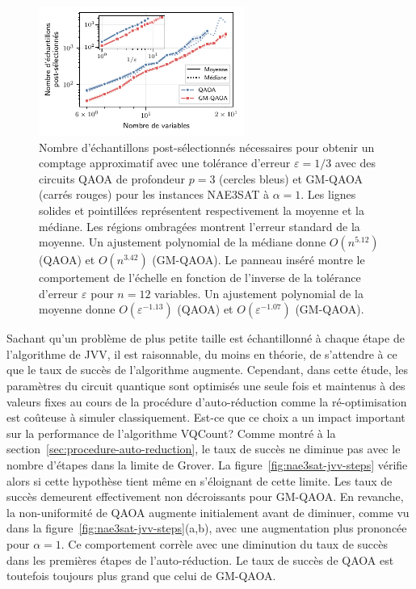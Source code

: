 \begin{figure}[H]
    \centering
    \includegraphics[width=0.6\textwidth]{figures/nae3sat-scaling.pdf}
    \caption[Comportement d'échelle du nombre d'échantillons post-sélectés pour \#NAE3SAT]{Nombre d'échantillons post-sélectionnés nécessaires pour obtenir un comptage approximatif avec une tolérance d'erreur $\varepsilon=1/3$ avec des circuits QAOA de profondeur $p=3$ (cercles bleus) et GM-QAOA (carrés rouges) pour les instances NAE3SAT à $\alpha=1$. Les lignes solides et pointillées représentent respectivement la moyenne et la médiane. Les régions ombragées montrent l'erreur standard de la moyenne. Un ajustement polynomial de la médiane donne $O(n^{5.12})$ (QAOA) et $O(n^{3.42})$ (GM-QAOA). Le panneau inséré montre le comportement de l'échelle en fonction de l'inverse de la tolérance d'erreur $\varepsilon$ pour $n=12$ variables. Un ajustement polynomial de la moyenne donne $O(\varepsilon^{-1.13})$ (QAOA) et $O(\varepsilon^{-1.07})$ (GM-QAOA).}
    \label{fig:nae3sat-scaling}
\end{figure}

Sachant qu'un problème de plus petite taille est échantillonné à chaque étape de l'algorithme de JVV, il est raisonnable, du moins en théorie, de s'attendre à ce que le taux de succès de l'algorithme augmente. Cependant, dans cette étude, les paramètres du circuit quantique sont optimisés une seule fois et maintenus à des valeurs fixes au cours de la procédure d'auto-réduction comme la ré-optimisation est coûteuse à simuler classiquement. Est-ce que ce choix a un impact important sur la performance de l'algorithme VQCount? Comme montré à la section~\ref{sec:procedure-auto-reduction}, le taux de succès ne diminue pas avec le nombre d'étapes dans la limite de Grover. La figure~\ref{fig:nae3sat-jvv-steps} vérifie alors si cette hypothèse tient même en s'éloignant de cette limite. Les taux de succès demeurent effectivement non décroissants pour GM-QAOA. En revanche, la non-uniformité de QAOA augmente initialement avant de diminuer, comme vu dans la figure~\ref{fig:nae3sat-jvv-steps}(a,b), avec une augmentation plus prononcée pour $\alpha = 1$. Ce comportement corrèle avec une diminution du taux de succès dans les premières étapes de l'auto-réduction. Le taux de succès de QAOA est toutefois toujours plus grand que celui de GM-QAOA. 

